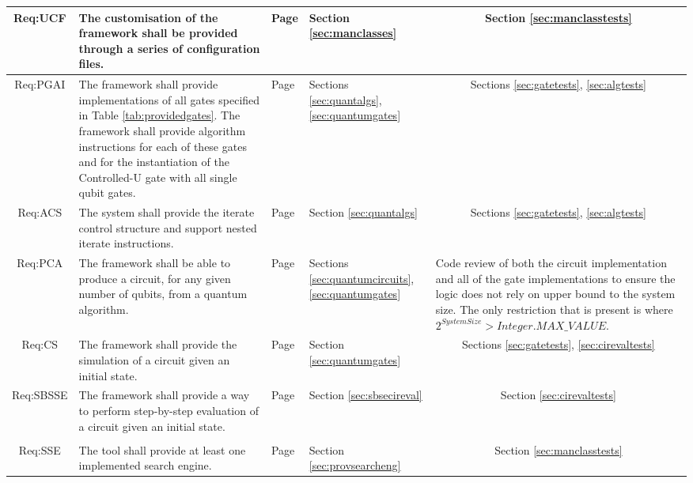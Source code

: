 \begin{landscape}
\begin{longtable}{|c|m{10cm}|m{3cm}|m{3cm}|m{4cm}|}
Req:UCF &
The customisation of the framework shall be provided through a series of configuration files. &
Page \pageref{sec:requcf} &
Section \ref{sec:manclasses} &
\multicolumn{1}{c|}{Section \ref{sec:manclasstests}} \\ \hline

Req:PGAI &
The framework shall provide implementations of all gates specified in Table \ref{tab:providedgates}. The framework shall provide algorithm instructions for each of these gates and for the instantiation of the Controlled-U gate with all single qubit gates. &
Page \pageref{sec:reqpgai} &
Sections \ref{sec:quantalgs}, \ref{sec:quantumgates} &
\multicolumn{1}{c|}{Sections \ref{sec:gatetests}, \ref{sec:algtests}} \\ \hline

Req:ACS &
The system shall provide the iterate control structure and support nested iterate instructions. &
Page \pageref{sec:reqacs} &
Section \ref{sec:quantalgs} &
\multicolumn{1}{c|}{Sections \ref{sec:gatetests}, \ref{sec:algtests}} \\ \hline

Req:PCA &
The framework shall be able to produce a circuit, for any given number of qubits, from a quantum algorithm. &
Page \pageref{sec:reqpca} &
Sections \ref{sec:quantumcircuits}, \ref{sec:quantumgates} &
Code review of both the circuit implementation and all of the gate implementations to ensure the logic does not rely on upper bound to the system size.
The only restriction that is present is where $2^{System Size}>Integer.MAX\_VALUE$. \\ \hline

Req:CS &
The framework shall provide the simulation of a circuit given an initial state. &
Page \pageref{sec:reqcs} &
Section \ref{sec:quantumgates} &
\multicolumn{1}{c|}{Sections \ref{sec:gatetests}, \ref{sec:cirevaltests}} \\ \hline

Req:SBSSE &
The framework shall provide a way to perform step-by-step evaluation of a circuit given an initial state. &
Page \pageref{sec:reqsbsse} &
Section \ref{sec:sbsecireval} &
\multicolumn{1}{c|}{Section \ref{sec:cirevaltests}} \\ \hline

&&&&
\\ \hline

Req:SSE &
The tool shall provide at least one implemented search engine. &
Page \pageref{sec:reqsse} &
Section \ref{sec:provsearcheng} &
\multicolumn{1}{c|}{Section \ref{sec:manclasstests}} \\ \hline


\end{longtable}
\end{landscape}
